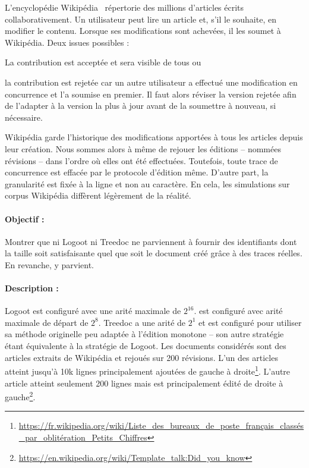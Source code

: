 L'encyclopédie Wikipédia~\cite{wikipedia} répertorie des millions d'articles
écrits collaborativement. Un utilisateur peut lire un article et, s'il le
souhaite, en modifier le contenu. Lorsque ses modifications sont achevées, il
les soumet à Wikipédia. Deux issues possibles :
\begin{inparaenum}[(i)]
\item La contribution est acceptée et sera visible de tous ou
\item la contribution est rejetée car un autre utilisateur a effectué une
  modification en concurrence et l'a soumise en premier. Il faut alors réviser
  la version rejetée afin de l'adapter à la version la plus à jour avant de la
  soumettre à nouveau, si nécessaire.
\end{inparaenum}
Wikipédia garde l'historique des modifications apportées à tous les articles
depuis leur création. Nous sommes alors à même de rejouer les éditions --
nommées révisions -- dans l'ordre où elles ont été effectuées. Toutefois, toute
trace de concurrence est effacée par le protocole d'édition même. D'autre part,
la granularité est fixée à la ligne et non au caractère. En cela, les
simulations sur corpus Wikipédia diffèrent légèrement de la réalité.


\paragraph{Objectif :} Montrer que ni Logoot ni Treedoc ne parviennent à fournir
des identifiants dont la taille soit satisfaisante quel que soit le document
créé grâce à des traces réelles. En revanche, \LSEQ y parvient.

\paragraph{Description :} Logoot est configuré avec une arité maximale de
$2^{16}$. \LSEQ est configuré avec arité maximale de départ de $2^{8}$. Treedoc
a une arité de $2^1$ et est configuré pour utiliser sa méthode originelle peu
adaptée à l'édition monotone -- son autre stratégie étant équivalente à la
stratégie de Logoot. Les documents considérés sont des articles extraits de
Wikipédia et rejoués sur 200 révisions. L'un des articles atteint jusqu'à 10k
lignes principalement ajoutées de gauche à
droite\footnote{\scriptsize\url{https://fr.wikipedia.org/wiki/Liste_des_bureaux_de_poste_français_classés_par_oblitération_Petits_Chiffres}}. L'autre
article atteint seulement 200 lignes mais est principalement édité de droite à
gauche\footnote{\scriptsize\url{https://en.wikipedia.org/wiki/Template_talk:Did_you_know}}.

